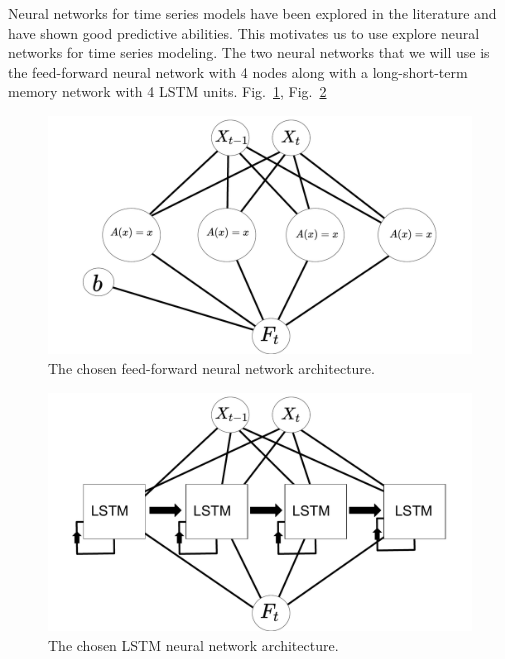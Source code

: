 \documentclass[10pt,a4paper]{article}
\begin{document}
Neural networks for time series models have been explored in the literature  \cite{Adhikari_2013,Oancea_2014,Chaudhuri_2016} and have shown good predictive abilities. This motivates us to use explore neural networks for time series modeling. The two neural networks that we will use is the feed-forward neural network with 4 nodes along with a long-short-term memory network with 4 LSTM units. Fig.~\ref{fig:FFNN architecture}, Fig.~\ref{fig:LSTM architecture}

\begin{figure}[h]
\begin{center}
\includegraphics[scale=0.4]{Neural_net_schematic_FFNN.pdf}
\caption{The chosen feed-forward neural network architecture.}
\label{fig:FFNN architecture}
\centering
\end{center}
\end{figure}


\begin{figure}[h]
\begin{center}
\includegraphics[scale=0.4]{Neural_net_schematic_LSTM.pdf}
\caption{The chosen LSTM neural network architecture.}
\label{fig:LSTM architecture}
\centering
\end{center}
\end{figure}
\end{document}

